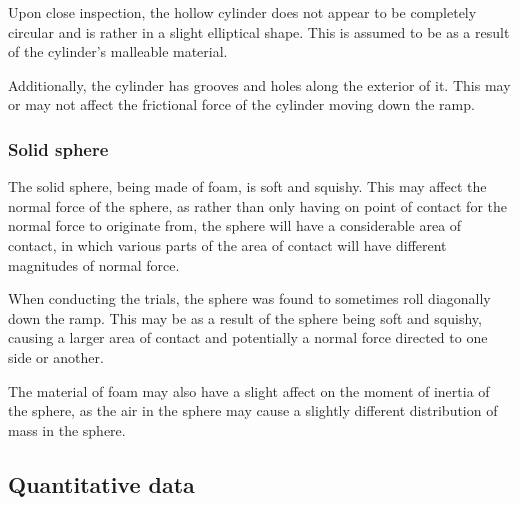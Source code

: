 \documentclass[letterpaper, 12pt]{article}
\begin{document}
Upon close inspection, the hollow cylinder does not appear to be completely circular
and is rather in a slight elliptical shape. This is assumed to be as a result of
the cylinder's malleable material.

Additionally, the cylinder has grooves and holes along the exterior of it. This may
or may not affect the frictional force of the cylinder moving down the ramp.

\subsubsection{Solid sphere}

The solid sphere, being made of foam, is soft and squishy. This may affect the
normal force of the sphere, as rather than only having on point of contact for the
normal force to originate from, the sphere will have a considerable area of contact,
in which various parts of the area of contact will have different magnitudes of
normal force.

When conducting the trials, the sphere was found to sometimes roll diagonally down the
ramp. This may be as a result of the sphere being soft and squishy, causing a larger
area of contact and potentially a normal force directed to one side or another.

The material of foam may also have a slight affect on the moment of inertia of the
sphere, as the air in the sphere may cause a slightly different distribution of mass
in the sphere.

\subsection{Quantitative data}
\end{document}
